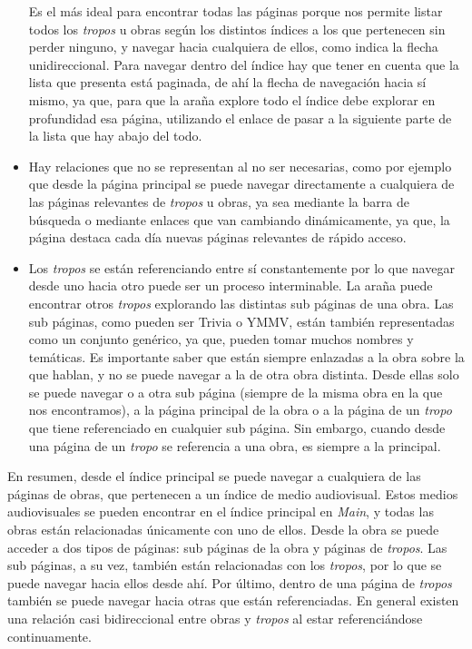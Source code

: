 \begin{itemize}
  Es el más ideal para encontrar todas las páginas porque nos permite listar
  todos los \textit{tropos} u obras según los distintos índices a los que
  pertenecen sin perder ninguno, y navegar hacia cualquiera de ellos, como
  indica la flecha unidireccional. Para navegar dentro del índice hay que tener
  en cuenta que la lista que presenta está paginada, de ahí la flecha de
  navegación hacia sí mismo, ya que, para que la araña explore todo el índice
  debe explorar en profundidad esa página, utilizando el enlace de pasar a la
  siguiente parte de la lista que hay abajo del todo.
  \item Hay relaciones que no se representan al no ser necesarias, como por
  ejemplo que desde la página principal se puede navegar directamente a
  cualquiera de las páginas relevantes de \textit{tropos} u obras, ya sea
  mediante la barra de búsqueda o mediante enlaces que van cambiando
  dinámicamente, ya que, la página destaca cada día nuevas páginas relevantes de
  rápido acceso.
  \item Los \textit{tropos} se están referenciando entre sí constantemente por
  lo que navegar desde uno hacia otro puede ser un proceso interminable. La
  araña puede encontrar otros \textit{tropos} explorando las distintas sub
  páginas de una obra. Las sub páginas, como pueden ser Trivia o YMMV, están
  también representadas como un conjunto genérico, ya que, pueden tomar muchos
  nombres y temáticas. Es importante saber que están siempre enlazadas a la obra
  sobre la que hablan, y no se puede navegar a la de otra obra distinta. Desde
  ellas solo se puede navegar o a otra sub página (siempre de la misma obra en
  la que nos encontramos), a la página principal de la obra o a la página de un
  \textit{tropo} que tiene referenciado en cualquier sub página. Sin embargo,
  cuando desde una página de un \textit{tropo} se referencia a una obra, es
  siempre a la principal.
\end{itemize}

En resumen, desde el índice principal se puede navegar a cualquiera de las
páginas de obras, que pertenecen a un índice de medio audiovisual. Estos medios
audiovisuales se pueden encontrar en el índice principal en \textit{Main}, y
todas las obras están relacionadas únicamente con uno de ellos. Desde la obra se
puede acceder a dos tipos de páginas: sub páginas de la obra y páginas de
\textit{tropos}. Las sub páginas, a su vez, también están relacionadas con los
\textit{tropos}, por lo que se puede navegar hacia ellos desde ahí. Por último,
dentro de una página de \textit{tropos} también se puede navegar hacia otras que
están referenciadas. En general existen una relación casi bidireccional entre
obras y \textit{tropos} al estar referenciándose continuamente. 

